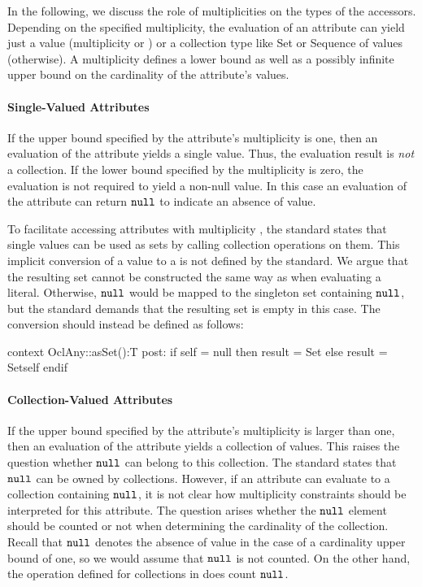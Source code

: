 In the following, we discuss the role of multiplicities on the types of the
accessors.
Depending on the specified multiplicity, the evaluation of an attribute can
yield just a value (multiplicity  or )
or a collection type like Set or Sequence of values (otherwise).
A multiplicity defines a lower bound as well as a possibly infinite upper
bound on the cardinality of the attribute's values.


\paragraph{Single-Valued Attributes}\label{sec:single-valued-properties}
If the upper bound specified by the attribute's multiplicity is one,
then an evaluation of the attribute yields a single value.
Thus, the evaluation result is \emph{not} a collection. If the lower bound specified by the
multiplicity is zero, the evaluation is not required to yield a non-null value. In this case an
evaluation of the attribute can return $\mathtt{null}$ to indicate an
absence of value.

To facilitate accessing attributes with multiplicity , the \OCL
standard states that single values can be used as sets by calling collection
operations on them. This implicit conversion of a value to a
 is not defined by the standard. We argue that the resulting set
cannot be constructed the same way as when evaluating a 
literal. Otherwise, $\mathtt{null}$ would be mapped to the singleton set
containing $\mathtt{null}$, but the standard demands that
the resulting set is empty in this case. The conversion should instead
be defined as follows:
\begin{ocl}
context OclAny::asSet():T
  post: if self = null then result = Set{}
        else result = Set{self} endif
\end{ocl}

\paragraph{Collection-Valued Attributes}\label{sec:collection-valued-properties}
If the upper bound specified by the attribute's multiplicity is larger than one,
then an evaluation of the attribute yields a collection of values.  This raises
the question whether $\mathtt{null}$ can belong to this collection. The \OCL
standard states that $\mathtt{null}$ can be owned by collections. However, if
an attribute can evaluate to a collection containing $\mathtt{null}$, it is not
clear how multiplicity constraints should be interpreted for this attribute. The
question arises whether the $\mathtt{null}$ element should be counted or not
when determining the cardinality of the collection. Recall that $\mathtt{null}$
denotes the absence of value in the case of a cardinality upper bound of one, so
we would assume that $\mathtt{null}$ is not counted. On the other hand, the
operation  defined for collections in \OCL does count
$\mathtt{null}$.

